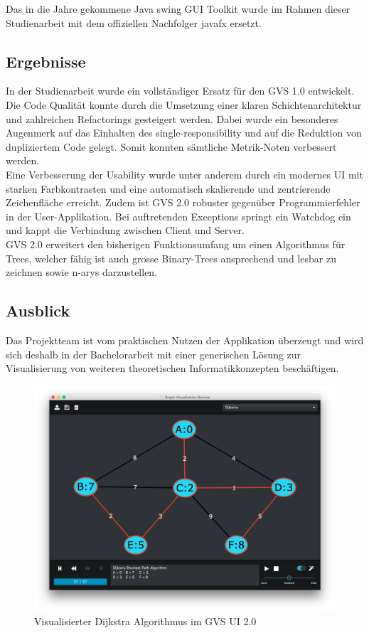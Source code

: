 \documentclass[11pt,a4paper,english,oneside]{book}
\numberwithin{equation}{chapter}
\begin{document}
	\noindent
	Das in die Jahre gekommene Java \gls{swing} GUI Toolkit wurde im Rahmen dieser Studienarbeit mit dem offiziellen Nachfolger \gls{javafx} ersetzt. 
	
	\subsection*{Ergebnisse}
	In der Studienarbeit wurde ein vollständiger Ersatz für den GVS 1.0 entwickelt.\\
	Die Code Qualität konnte durch die Umsetzung einer klaren Schichtenarchitektur und zahlreichen Refactorings gesteigert werden. Dabei wurde ein besonderes Augenmerk auf das Einhalten des \gls{single-responsibility} und auf die Reduktion von dupliziertem Code gelegt. Somit konnten sämtliche Metrik-Noten verbessert werden.\\
	Eine Verbesserung der Usability wurde unter anderem durch ein modernes UI mit starken Farbkontrasten und eine automatisch skalierende und zentrierende Zeichenfläche erreicht. Zudem ist GVS 2.0 robuster gegenüber Programmierfehler in der User-Applikation. Bei auftretenden Exceptions springt ein Watchdog ein und kappt die Verbindung zwischen Client und Server.\\
	GVS 2.0 erweitert den bisherigen Funktionsumfang um einen Algorithmus für Trees, welcher fähig ist auch grosse Binary-Trees ansprechend und lesbar zu zeichnen sowie \glspl{n-ary} darzustellen.
	
	\subsection*{Ausblick}
	Das Projektteam ist vom praktischen Nutzen der Applikation überzeugt und wird sich deshalb in der Bachelorarbeit mit einer generischen Lösung zur Visualisierung von weiteren theoretischen Informatikkonzepten beschäftigen.
	
	\begin{figure}[h!]
		\centering
		\includegraphics[width=0.6\linewidth]{assets/images/gvs-overview}
		\caption{Visualisierter Dijkstra Algorithmus im GVS UI 2.0}
		\label{fig:gvs-overview}
	\end{figure}
	
\end{document}
